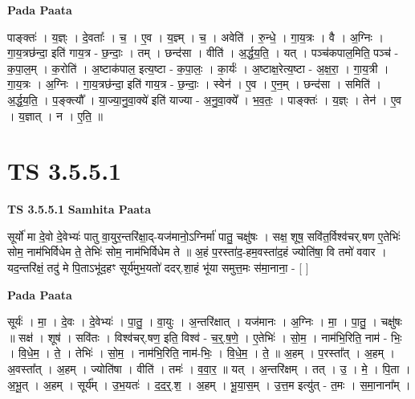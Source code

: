 \documentclass[17pt]{extarticle}
\begin{document}
\textbf{Pada Paata} \newline

पाङ्क्तः॑ । य॒ज्ञ्ः । दे॒वताः᳚ । च॒ । ए॒व । य॒ज्ञ्म् । च॒ । अवेति॑ । रु॒न्धे॒ । गा॒य॒त्रः । वै । अ॒ग्निः । गा॒य॒त्रछ॑न्दा॒ इति॑ गाय॒त्र - छ॒न्दाः॒ । तम् । छन्द॑सा । वीति॑ । अ॒र्द्ध॒य॒ति॒ । यत् । पञ्च॑कपाल॒मिति॒ पञ्च॑ - क॒पा॒ल॒म् । क॒रोति॑ । अ॒ष्टाक॑पाल॒ इत्य॒ष्टा - क॒पा॒लः॒ । का॒र्यः॑ । अ॒ष्टाक्ष॒रेत्य॒ष्टा - अ॒क्ष॒रा॒ । गा॒य॒त्री । गा॒य॒त्रः । अ॒ग्निः । गा॒य॒त्रछ॑न्दा॒ इति॑ गाय॒त्र - छ॒न्दाः॒ । स्वेन॑ । ए॒व । ए॒न॒म् । छन्द॑सा । समिति॑ । अ॒र्द्ध॒य॒ति॒ । प॒ङ्क्त्यौ᳚ । या॒ज्या॒नु॒वा॒क्ये॑ इति॑ याज्या - अ॒नु॒वा॒क्ये᳚ । भ॒व॒तः॒ । पाङ्क्तः॑ । य॒ज्ञ्ः । तेन॑ । ए॒व । य॒ज्ञात् । न । ए॒ति॒ ॥  \newline





\section{ TS 3.5.5.1 }

\textbf{TS 3.5.5.1 } \newline
\textbf{Samhita Paata} \newline

सूर्यो॑ मा दे॒वो दे॒वेभ्यः॑ पातु वा॒युर॒न्तरि॑क्षा॒द्-यज॑मानो॒ऽग्निर्मा॑ पातु॒ चक्षु॑षः । सक्ष॒ शूष॒ सवि॑त॒र्विश्व॑चर्.षण ए॒तेभिः॑ सोम॒ नाम॑भिर्विधेम ते॒ तेभिः॑ सोम॒ नाम॑भिर्विधेम ते ॥ अ॒हं प॒रस्ता॑द॒-हम॒वस्ता॑द॒हं ज्योति॑षा॒ वि तमो॑ ववार । यद॒न्तरि॑क्षं॒ तदु॑ मे पि॒ताऽभू॑द॒हꣳ सूर्य॑मुभ॒यतो॑ ददर्.शा॒हं भू॑या समुत्त॒मः स॑मा॒नाना॒ - [  ] \newline

\textbf{Pada Paata} \newline

सूर्यः॑ । मा॒ । दे॒वः । दे॒वेभ्यः॑ । पा॒तु॒ । वा॒युः । अ॒न्तरि॑क्षात् । यज॑मानः । अ॒ग्निः । मा॒ । पा॒तु॒ । चक्षु॑षः ॥ सक्ष॑ । शूष॑ । सवि॑तः । विश्व॑चर्.षण॒ इति॒ विश्व॑ - च॒र्॒.ष॒णे॒ । ए॒तेभिः॑ । सो॒म॒ । नाम॑भि॒रिति॒ नाम॑ - भिः॒ । वि॒धे॒म॒ । ते॒ । तेभिः॑ । सो॒म॒ । नाम॑भि॒रिति॒ नाम॑-भिः॒ । वि॒धे॒म॒ । ते॒ ॥ अ॒हम् । प॒रस्ता᳚त् । अ॒हम् । अ॒वस्ता᳚त् । अ॒हम् । ज्योति॑षा । वीति॑ । तमः॑ । व॒वा॒र॒ ॥ यत् । अ॒न्तरि॑क्षम् । तत् । उ॒ । मे॒ । पि॒ता । अ॒भू॒त् । अ॒हम् । सूर्य᳚म् । उ॒भ॒यतः॑ । द॒द॒र्॒.श॒ । अ॒हम् । भू॒या॒स॒म् । उ॒त्त॒म इत्यु॑त् - त॒मः । स॒मा॒नाना᳚म् ।  \newline




\end{document}
